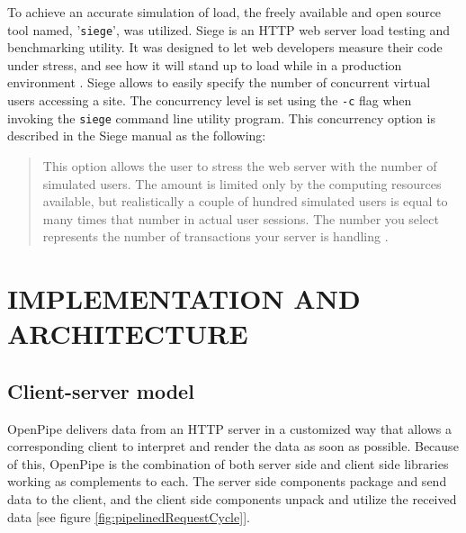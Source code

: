 \documentclass[12pt]{report}
\begin{document}
To achieve an accurate simulation of load, the freely available and open source tool named, '\texttt{siege}', was utilized. Siege is an HTTP web server load testing and benchmarking utility. It was designed to let web developers measure their code under stress, and see how it will stand up to load while in a production environment \cite{SiegeHomepage}.  Siege allows to easily specify the number of concurrent virtual users accessing a site. The concurrency level is set using the \texttt{-c} flag when invoking the \texttt{siege} command line utility program. This concurrency option is described in the Siege manual as the following:

\begin{quote}
This option allows the user to stress the web server with the number of simulated users. The amount is limited only by the computing resources available, but realistically a couple of hundred simulated users is equal to many times that number in actual user sessions. The number you select represents the number of transactions your server is handling \cite{SiegeManual}.
\end{quote}




\chapter{IMPLEMENTATION AND ARCHITECTURE}

\section{Client-server model}
OpenPipe delivers data from an HTTP server in a customized way that allows a corresponding client to interpret and render the data as soon as possible. Because of this, OpenPipe is the combination of both server side and client side libraries working as complements to each. The server side components package and send data to the client, and the client side components unpack and utilize the received data [see figure \ref{fig:pipelinedRequestCycle}].
\end{document}
